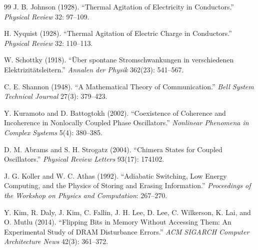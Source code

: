 \documentclass[12pt]{article}
\begin{document}
\begin{thebibliography}{99}
 J. B. Johnson (1928). ``Thermal Agitation of Electricity in Conductors.'' \emph{Physical Review} 32: 97--109.

 H. Nyquist (1928). ``Thermal Agitation of Electric Charge in Conductors.'' \emph{Physical Review} 32: 110--113.

 W. Schottky (1918). ``\"Uber spontane Stromschwankungen in verschiedenen Elektrizit\"atsleitern.'' \emph{Annalen der Physik} 362(23): 541--567.

 C. E. Shannon (1948). ``A Mathematical Theory of Communication.'' \emph{Bell System Technical Journal} 27(3): 379--423.

 Y. Kuramoto and D. Battogtokh (2002). ``Coexistence of Coherence and Incoherence in Nonlocally Coupled Phase Oscillators.'' \emph{Nonlinear Phenomena in Complex Systems} 5(4): 380--385.

 D. M. Abrams and S. H. Strogatz (2004). ``Chimera States for Coupled Oscillators.'' \emph{Physical Review Letters} 93(17): 174102.

 J. G. Koller and W. C. Athas (1992). ``Adiabatic Switching, Low Energy Computing, and the Physics of Storing and Erasing Information.'' \emph{Proceedings of the Workshop on Physics and Computation}: 267--270.

 Y. Kim, R. Daly, J. Kim, C. Fallin, J. H. Lee, D. Lee, C. Wilkerson, K. Lai, and O. Mutlu (2014). ``Flipping Bits in Memory Without Accessing Them: An Experimental Study of DRAM Disturbance Errors.'' \emph{ACM SIGARCH Computer Architecture News} 42(3): 361--372.

\end{thebibliography}
\end{document}
